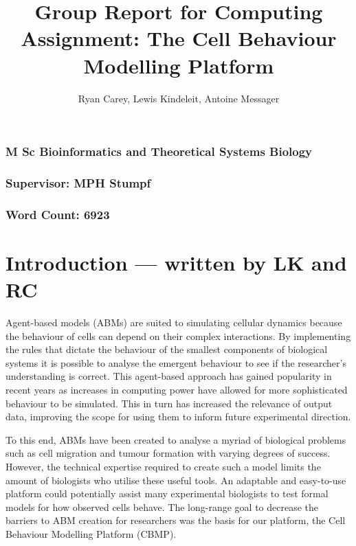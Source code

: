 \documentclass[12pt]{article}
\title{Group Report for Computing Assignment: The Cell Behaviour Modelling Platform}
\author{Ryan Carey, Lewis Kindeleit, Antoine Messager}
\begin{document}
\maketitle
{\centering
\subsubsection*{M Sc Bioinformatics and Theoretical Systems Biology}
\subsubsection*{Supervisor: MPH Stumpf} 
\subsubsection*{Word Count: 6923}
}

\newpage
\tableofcontents
\newpage
\section{Introduction --- written by LK and RC} 
Agent-based models (ABMs) are suited to simulating cellular dynamics because the behaviour of cells can 
depend on their complex interactions.\cite{kaul15} By implementing the rules 
that dictate the behaviour of the smallest components of biological systems it is possible to analyse the emergent 
behaviour to see if the researcher’s understanding is correct. This agent-based approach has gained popularity in recent 
years as increases in computing power have allowed for more sophisticated behaviour to be simulated. 
This in turn has increased the relevance of output data, improving the scope for using them to inform 
future experimental direction. \cite{grimm06} \cite{drasdo07}

To this end, ABMs have been created to analyse a myriad of biological problems such as cell migration 
and tumour formation with varying degrees of success. However, the technical expertise required to 
create such a model limits the amount of biologists who utilise these useful tools. An adaptable and 
easy-to-use platform could potentially assist many experimental biologists to test formal models for 
how observed cells behave. The long-range goal to decrease the barriers to  ABM creation for researchers 
was the basis for our platform, the Cell Behaviour Modelling Platform (CBMP).
\end{document}
